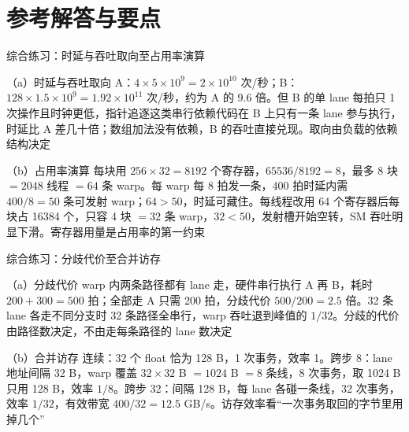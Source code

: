 \section*{参考解答与要点}

\begin{chapteranswer}{综合练习：时延与吞吐取向至占用率演算}
\begin{answersubproblem}{（a）时延与吞吐取向}
A：$4\times5\times10^{9}=2\times10^{10}$ 次/秒；B：$128\times1.5\times10^{9}=1.92\times10^{11}$ 次/秒，约为 A 的 9.6 倍。但 B 的单 lane 每拍只 1 次操作且时钟更低，指针追逐这类串行依赖代码在 B 上只有一条 lane 参与执行，时延比 A 差几十倍；数组加法没有依赖，B 的吞吐直接兑现。取向由负载的依赖结构决定
\end{answersubproblem}
\begin{answersubproblem}{（b）占用率演算}
每块用 $256\times32=8192$ 个寄存器，$65536/8192=8$，最多 8 块 $=2048$ 线程 $=64$ 条 warp。每 warp 每 8 拍发一条，400 拍时延内需 $400/8=50$ 条可发射 warp；$64>50$，时延可藏住。每线程改用 64 个寄存器后每块占 16384 个，只容 4 块 $=32$ 条 warp，$32<50$，发射槽开始空转，SM 吞吐明显下滑。寄存器用量是占用率的第一约束
\end{answersubproblem}
\end{chapteranswer}

\begin{chapteranswer}{综合练习：分歧代价至合并访存}
\begin{answersubproblem}{（a）分歧代价}
warp 内两条路径都有 lane 走，硬件串行执行 A 再 B，耗时 $200+300=500$ 拍；全部走 A 只需 200 拍，分歧代价 $500/200=2.5$ 倍。32 条 lane 各走不同分支时 32 条路径全串行，warp 吞吐退到峰值的 $1/32$。分歧的代价由路径数决定，不由走每条路径的 lane 数决定
\end{answersubproblem}
\begin{answersubproblem}{（b）合并访存}
连续：32 个 float 恰为 128 B，1 次事务，效率 1。跨步 8：lane 地址间隔 32 B，warp 覆盖 $32\times32$ B $=1024$ B $=8$ 条线，8 次事务，取 1024 B 只用 128 B，效率 $1/8$。跨步 32：间隔 128 B，每 lane 各碰一条线，32 次事务，效率 $1/32$，有效带宽 $400/32=12.5$ GB/s。访存效率看“一次事务取回的字节里用掉几个”
\end{answersubproblem}
\end{chapteranswer}

